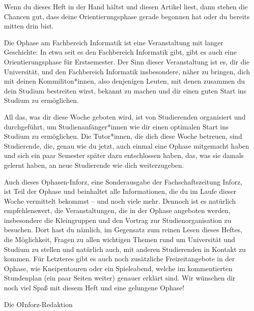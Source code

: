 {Wenn du dieses Heft in der Hand hältst und diesen Artikel liest, dann stehen die Chancen gut, dass deine Orientierungsphase gerade begonnen hat oder du bereits mitten drin bist.}
{
    Die Ophase am Fachbereich Informatik ist eine Veranstaltung mit langer Geschichte: In etwa seit es den Fachbereich Informatik gibt, gibt es auch eine Orientierungsphase für Erstsemester. Der Sinn dieser Veranstaltung ist es, dir die Universität, und den Fachbereich Informatik insbesondere, näher zu bringen, dich mit deinen Kommiliton*innen, also denjenigen Leuten, mit denen zusammen du dein Studium bestreiten wirst, bekannt zu machen und dir einen guten Start ins Studium zu ermöglichen.

    All das, was dir diese Woche geboten wird, ist von Studierenden organisiert und durchgeführt, um Studienanfänger*innen wie dir einen optimalen Start ins Studium zu ermöglichen. Die Tutor*innen, die dich diese Woche betreuen, sind Studierende, die, genau wie du jetzt, auch einmal eine Ophase mitgemacht haben und sich ein paar Semester später dazu entschlossen haben, das, was sie damals gelernt haben, an neue Studierende wie dich weiterzugeben.

    Auch dieses Ophasen-Inforz, eine Sonderausgabe der Fachschaftszeitung Inforz, ist Teil der Ophase und beinhaltet alle Informationen, die du im Laufe dieser Woche vermittelt bekommst – und noch viele mehr. Dennoch ist es natürlich empfehlenswert, die Veranstaltungen, die in der Ophase angeboten werden, insbesondere die Kleingruppen und den Vortrag zur Studienorganisation zu besuchen. Dort hast du nämlich, im Gegensatz zum reinen Lesen dieses Heftes, die Möglichkeit, Fragen zu allen wichtigen Themen rund um Universität und Studium zu stellen und natürlich auch, mit anderen Studierenden in Kontakt zu kommen. Für Letzteres gibt es auch noch zusätzliche Freizeitangebote in der Ophase, wie Kneipentouren oder ein Spieleabend, welche im kommentierten Stundenplan (ein paar Seiten weiter) genauer erklärt sind.
    Wir wünschen dir noch viel Spaß mit diesem Heft und eine gelungene Ophase!
}
{Die OInforz-Redaktion}

\vspace{37mm}

\newpage
